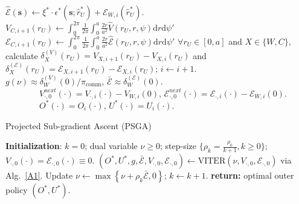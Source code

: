 \documentclass[10pt, twocolumn]{IEEEtran}
\theoremstyle{plain}
\theoremstyle{definition}
\theoremstyle{remark}
\begin{document}
\begin{algorithm*} [t]
\begin{algorithmic}[1]
        		\State $\hat {\mathcal E}(\mathbf{s}){\gets}\xi^*\cdot\epsilon^{*}(\mathbf{s};\hat r_U^*){+}\mathcal E_{W,i}(\hat r_U^*)$.
        	\EndFor
	\State $V_{C,i{+}1}(r_{U}){\gets}\int_{0}^{2\pi}\frac{1}{2\pi}\int_{0}^{a}\frac{2r}{a^{2}}
	\hat V(r_U,r,\psi)\mathrm{d}r\mathrm{d}\psi'$
	\State ${\mathcal E}_{C,i{+}1}(r_{U}){\gets}\int_{0}^{2\pi}\frac{1}{2\pi}\int_{0}^{a}\frac{2r}{a^{2}}
	\hat {\mathcal E}(r_U,r,\psi)\mathrm{d}r\mathrm{d}\psi'$
	\EndFor
        	\State ${\forall}r_U\in[0,a]$ and $X\in\{W,C\}$, calculate $\delta_X^{(V)}(r_U){=}V_{X,i{+}1}(r_U){-}V_{X,i}(r_U)$
	and $\delta_X^{(\mathcal E)}(r_U){=}\mathcal E_{X,i{+}1}(r_U){-}\mathcal E_{X,i}(r_U)$;
	 $i{\gets}i{+}1$.
         \\
    \Return $g(\nu){\approx}\delta_W^{(V)}(0)/\pi_{\mathrm{comm}}$,
    $\bar{\mathcal E}{\approx}\delta_W^{(\mathcal E)}(0)$.\\
     \ \ \ \ \ \ \ \ $V_{\cdot,0}^{next}(\cdot){=}V_{\cdot,i}(\cdot){-}V_{W,i}(0)$, $\mathcal E_{\cdot,0}^{next}(\cdot){=}\mathcal E_{\cdot,i}(\cdot){-}\mathcal E_{W,i}(0)$.
    \\
     \ \ \ \ \ \ \ \ $O^{*}(\cdot){=}O_{i}(\cdot)$, $U^{*}(\cdot){=}U_{i}(\cdot)$.
    \end{algorithmic}
\end{algorithm*}
\begin{algorithm*} [t]
\caption{Projected Sub-gradient Ascent (PSGA)}\label{A2}
    \begin{algorithmic}[1]
    \scriptsize
    \State \textbf{Initialization}: $k=0$; dual variable $\nu{\geq}0$; step-size $\{\rho_{k}{=}\frac{\rho_{0}}{k{+}1},k{\geq}0\}$; 
    $V_{\cdot,0}(\cdot){=}\mathcal E_{\cdot,0}(\cdot)\equiv 0$.
    \Repeat %
    	\State  $(O^{*},U^{*},g,\bar{\mathcal E},V_{\cdot,0},\mathcal E_{\cdot,0})\gets\mathrm{VITER}(\nu,V_{\cdot,0},\mathcal E_{\cdot,0})$ via Alg.~\ref{A1}.
    		\State Update $\nu\gets\max\left\{\nu{+}\rho_{k}\bar{\mathcal E},0\right\}$; $k{\gets}k{+}1$. 
     
    \State \textbf{return:} optimal outer policy $(O^{*},U^{*})$.
    \end{algorithmic}
\end{algorithm*}
\end{document}
